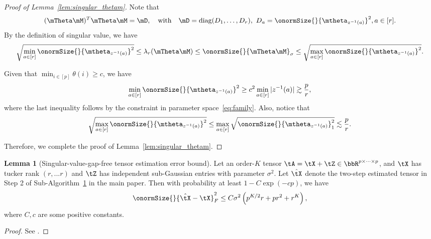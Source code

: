 \documentclass[lettersize,onecolumn,journal]{IEEEtran}
\theoremstyle{definition}
\newtheorem{lem}{Lemma}
\theoremstyle{definition}
\newcommand{\of}[1]{\left(#1\right)}
\begin{document}
\begin{proof}[Proof of Lemma~\ref{lem:singular_thetam}] Note that 
\begin{equation}
    (\mTheta\mM)^T \mTheta \mM = \mD, \quad \text{with} \quad \mD = \text{diag}(D_1,\ldots, D_r), \ D_a = \onormSize{}{\mtheta_{z^{-1}(a)}}^2, a \in [r].
\end{equation}
By the definition of singular value, we have 
\begin{equation}
     \sqrt{\min_{a \in [r]}\onormSize{}{ \mtheta_{ z^{-1}(a)} }^2 } \leq \lambda_r(\mTheta \mM) \leq \onormSize{}{\mTheta\mM}_{\sigma} \leq \sqrt{ \max_{a \in [r]}\onormSize{}{ \mtheta_{ z^{-1}(a)} }^2}.
\end{equation}


Given that $\min_{i \in [p]}\theta(i) \geq c$, we have  
\begin{equation}
   \min_{a \in [r]} \onormSize{}{ \mtheta_{ z^{-1}(a)} }^2 \geq c^2 \min_{a \in [r]} |z^{-1}(a)| \gtrsim \frac{p}{r},
\end{equation}
where the last inequality follows by the constraint in parameter space~\eqref{eq:family}. Also, notice that 
\begin{equation}
    \sqrt{\max_{a \in [r]}\onormSize{}{ \mtheta_{ z^{-1}(a)} }^2 } \leq \max_{a \in [r]} \sqrt{ \onormSize{}{ \mtheta_{ z^{-1}(a)} }^2_1} \lesssim \frac{p}{r}.
\end{equation}

 Therefore, we complete the proof of Lemma~\ref{lem:singular_thetam}.
\end{proof}


\begin{lem}[Singular-value-gap-free tensor estimation error bound]\label{lem:two-step_esterror} Let an order-$K$ tensor $\tA = \tX + \tZ \in \bbR^{p \times \cdots \times p}$, and $\tX$ has tucker rank $(r,...r)$ and $\tZ$ has independent sub-Gaussian entries with parameter $\sigma^2$. Let $\hat \tX$ denote the two-step estimated tensor in Step 2 of Sub-Algorithm~\hyperref[alg:main]{1} in the main paper. Then with probability at least $1 - C \exp\of{- cp }$, we have
\begin{align}
    \onormSize{}{\hat \tX - \tX}_F^2 \leq C \sigma^2 \of{ p^{K/2}r + pr^2 + r^K },
\end{align}
where $C, c$ are some positive constants.
\end{lem}

\begin{proof}
See \citet[Proposition 1]{han2020exact}.
\end{proof}
\end{document}
